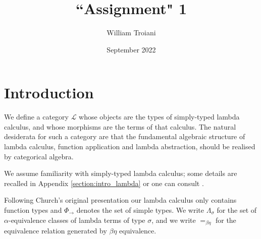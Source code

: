 \documentclass[english,letter paper,12pt,leqno]{article}
\title{``Assignment" 1}
\author{William Troiani}
\date{September 2022}
\def\typearrow{\Rightarrow}
\theoremstyle{example}
\numberwithin{equation}{section}
\newcommand{\call}[1]{\mathcal{#1}}
\def\typearrow{\rightarrow}
\begin{document}
\maketitle

\section{Introduction}
We define a category $\call{L}$ whose objects are the types of simply-typed lambda calculus, and whose morphisms are the terms of that calculus. The natural desiderata for such a category are that the fundamental algebraic structure of lambda calculus, function application and lambda abstraction, should be realised by categorical algebra. 

We assume familiarity with simply-typed lambda calculus; some details are recalled in Appendix \ref{section:intro_lambda} or one can consult \cite{TCR}.





Following Church's original presentation our lambda calculus only contains function types and $\Phi_{\typearrow}$ denotes the set of simple types. We write $\Lambda_\sigma$ for the set of $\alpha$-equivalence classes of lambda terms of type $\sigma$, and we write $=_{\beta\eta}$ for the equivalence relation generated by $\beta\eta$ equivalence.
\end{document}
